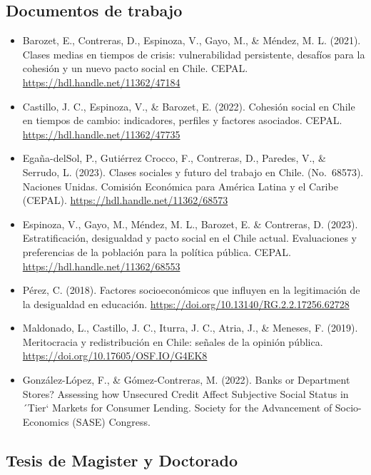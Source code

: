 \documentclass[
  12pt,
]{article}
\providecommand{\tightlist}{%
  \setlength{\itemsep}{0pt}\setlength{\parskip}{0pt}}
\begin{document}
\hypertarget{documentos-de-trabajo}{%
\subsection{Documentos de trabajo}\label{documentos-de-trabajo}}

\begin{itemize}
\tightlist
\item
  Barozet, E., Contreras, D., Espinoza, V., Gayo, M., \& Méndez, M. L. (2021). Clases medias en tiempos de crisis: vulnerabilidad persistente, desafíos para la cohesión y un nuevo pacto social en Chile. CEPAL. \url{https://hdl.handle.net/11362/47184}
\item
  Castillo, J. C., Espinoza, V., \& Barozet, E. (2022). Cohesión social en Chile en tiempos de cambio: indicadores, perfiles y factores asociados. CEPAL. \url{https://hdl.handle.net/11362/47735}
\item
  Egaña-delSol, P., Gutiérrez Crocco, F., Contreras, D., Paredes, V., \& Serrudo, L. (2023). Clases sociales y futuro del trabajo en Chile. (No.~68573). Naciones Unidas. Comisión Económica para América Latina y el Caribe (CEPAL). \url{https://hdl.handle.net/11362/68573}
\item
  Espinoza, V., Gayo, M., Méndez, M. L., Barozet, E. \& Contreras, D. (2023). Estratificación, desigualdad y pacto social en el Chile actual. Evaluaciones y preferencias de la población para la política pública. CEPAL. \url{https://hdl.handle.net/11362/68553}
\item
  Pérez, C. (2018). Factores socioeconómicos que influyen en la legitimación de la desigualdad en educación. \url{https://doi.org/10.13140/RG.2.2.17256.62728}
\item
  Maldonado, L., Castillo, J. C., Iturra, J. C., Atria, J., \& Meneses, F. (2019). Meritocracia y redistribución en Chile: señales de la opinión pública. \url{https://doi.org/10.17605/OSF.IO/G4EK8}
\item
  González-López, F., \& Gómez-Contreras, M. (2022). Banks or Department Stores? Assessing how Unsecured Credit Affect Subjective Social Status in ´Tier` Markets for Consumer Lending. Society for the Advancement of Socio-Economics (SASE) Congress.
\end{itemize}

\hypertarget{tesis-de-magister-y-doctorado}{%
\subsection{Tesis de Magister y Doctorado}\label{tesis-de-magister-y-doctorado}}
\end{document}
